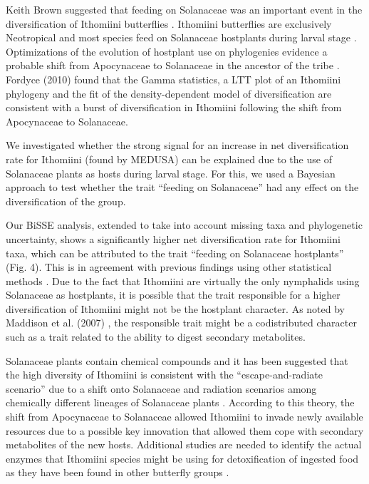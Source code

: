 \documentclass[10pt,letterpaper]{article} %
\begin{document}
Keith Brown suggested that feeding on Solanaceae was an important event
in the diversification of Ithomiini butterflies \cite{brown1987}. Ithomiini
butterflies are exclusively Neotropical and most species feed on
Solanaceae hostplants during larval stage \cite{willmott2006}. Optimizations of the
evolution of hostplant use on phylogenies evidence a probable shift from
Apocynaceae to Solanaceae in the ancestor of the tribe \cite{willmott2006, brower2006}.
Fordyce (2010) \cite{fordyce2010} found that the Gamma statistics, a LTT plot of
an Ithomiini phylogeny and the fit of the density-dependent model of
diversification are consistent with a burst of diversification in
Ithomiini following the shift from Apocynaceae to Solanaceae.

We investigated whether the strong signal for an increase in net
diversification rate for Ithomiini (found by MEDUSA) can be explained
due to the use of Solanaceae plants as hosts during larval stage. For
this, we used a Bayesian approach \cite{fitzjohn2009} to test whether the trait
``feeding on Solanaceae'' had any effect on the diversification of the
group.

Our BiSSE analysis, extended to take into account missing taxa and
phylogenetic uncertainty, shows a significantly higher net
diversification rate for Ithomiini taxa, which can be attributed to the
trait ``feeding on Solanaceae hostplants'' (Fig. 4). This is in
agreement with previous findings using other statistical methods
\cite{fordyce2010}. Due to the fact that Ithomiini are virtually the only
nymphalids using Solanaceae as hostplants, it is possible that the trait
responsible for a higher diversification of Ithomiini might not be the
hostplant character. As noted by Maddison et al. (2007) \cite{maddison2007}, the
responsible trait might be a codistributed character such as a trait
related to the ability to digest secondary metabolites.

Solanaceae plants contain chemical compounds and it has been suggested
that the high diversity of Ithomiini is consistent with the
``escape-and-radiate scenario'' due to a shift onto Solanaceae
\cite{fordyce2010}
and radiation scenarios among chemically different lineages of
Solanaceae plants \cite{willmott2006, brown1987}. According to this theory, the shift from
Apocynaceae to Solanaceae allowed Ithomiini to invade newly available
resources due to a possible key innovation that allowed them cope with
secondary metabolites of the new hosts. Additional studies are needed to
identify the actual enzymes that Ithomiini species might be using for
detoxification of ingested food as they have been found in other
butterfly groups \cite{wheat2007}.
\end{document}
